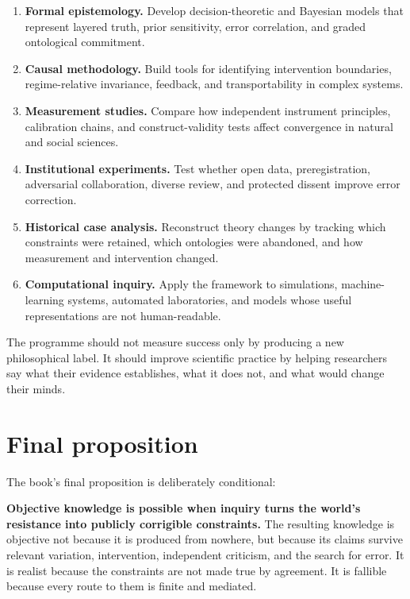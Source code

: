 \begin{enumerate}
\item \textbf{Formal epistemology.} Develop decision-theoretic and Bayesian
models that represent layered truth, prior sensitivity, error correlation, and
graded ontological commitment.
\item \textbf{Causal methodology.} Build tools for identifying intervention
boundaries, regime-relative invariance, feedback, and transportability in
complex systems.
\item \textbf{Measurement studies.} Compare how independent instrument
principles, calibration chains, and construct-validity tests affect convergence
in natural and social sciences.
\item \textbf{Institutional experiments.} Test whether open data, preregistration,
adversarial collaboration, diverse review, and protected dissent improve error
correction.
\item \textbf{Historical case analysis.} Reconstruct theory changes by tracking
which constraints were retained, which ontologies were abandoned, and how
measurement and intervention changed.
\item \textbf{Computational inquiry.} Apply the framework to simulations,
machine-learning systems, automated laboratories, and models whose useful
representations are not human-readable.
\end{enumerate}

The programme should not measure success only by producing a new philosophical
label. It should improve scientific practice by helping researchers say what
their evidence establishes, what it does not, and what would change their
minds.

\section{Final proposition}

The book's final proposition is deliberately conditional:

\begin{principlebox}
\textbf{Objective knowledge is possible when inquiry turns the world's
resistance into publicly corrigible constraints.} The resulting knowledge is
objective not because it is produced from nowhere, but because its claims
survive relevant variation, intervention, independent criticism, and the
search for error. It is realist because the constraints are not made true by
agreement. It is fallible because every route to them is finite and mediated.
\end{principlebox}

